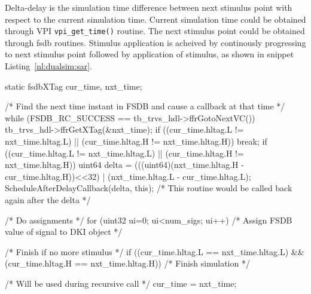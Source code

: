 Delta-delay is the simulation time difference between next stimulus point with respect to the current simulation time. Current simulation time could be obtained through VPI \verb|vpi_get_time()| routine. The next stimulus point could be obtained through fsdb routines. Stimulus application is acheived by continously progressing to next stimulus point followed by application of stimulus, as shown in snippet Listing~\ref{nl:dualsim:sar}.

\begin{newlisting}[caption=Stimulus Applicator Routine,label=nl:dualsim:sar]
  static fsdbXTag cur_time, nxt_time;

  /* Find the next time instant in FSDB and cause a callback at that time */
  while (FSDB_RC_SUCCESS == tb_trvs_hdl->ffrGotoNextVC()) {
    tb_trvs_hdl->ffrGetXTag(&nxt_time);
    if ((cur_time.hltag.L != nxt_time.hltag.L) || (cur_time.hltag.H != nxt_time.hltag.H)) break;
  }
  if ((cur_time.hltag.L != nxt_time.hltag.L) || (cur_time.hltag.H != nxt_time.hltag.H)) {
    uint64 delta = (((uint64)(nxt_time.hltag.H - cur_time.hltag.H))<<32) | (nxt_time.hltag.L - cur_time.hltag.L);
    ScheduleAfterDelayCallback(delta, this); /* This routine would be called back again after the delta */
  }

  /* Do assignments */
  for (uint32 ui=0; ui<num_sigs; ui++) {
    /* Assign FSDB value of signal to DKI object */
  }

  /* Finish if no more stimulus */
  if ((cur_time.hltag.L == nxt_time.hltag.L) && (cur_time.hltag.H == nxt_time.hltag.H)) {
    /* Finish simulation */
  }

  /* Will be used during recursive call */
  cur_time = nxt_time;
\end{newlisting}

